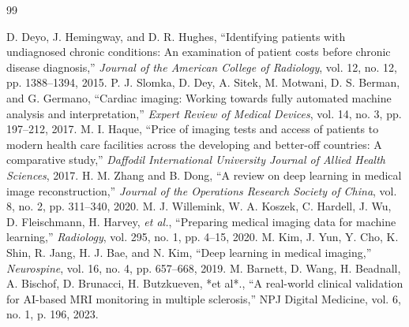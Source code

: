 \documentclass[12pt,letterpaper]{article}     %
\begin{document}
\newpage
\begin{thebibliography}{99}

D. Deyo, J. Hemingway, and D. R. Hughes, “Identifying patients with undiagnosed chronic conditions: An examination of patient costs before chronic disease diagnosis,” \textit{Journal of the American College of Radiology}, vol. 12, no. 12, pp. 1388–1394, 2015.
P. J. Slomka, D. Dey, A. Sitek, M. Motwani, D. S. Berman, and G. Germano, “Cardiac imaging: Working towards fully automated machine analysis and interpretation,” \textit{Expert Review of Medical Devices}, vol. 14, no. 3, pp. 197–212, 2017.
M. I. Haque, “Price of imaging tests and access of patients to modern health care facilities across the developing and better-off countries: A comparative study,” \textit{Daffodil International University Journal of Allied Health Sciences}, 2017.
H. M. Zhang and B. Dong, “A review on deep learning in medical image reconstruction,” \textit{Journal of the Operations Research Society of China}, vol. 8, no. 2, pp. 311–340, 2020.
M. J. Willemink, W. A. Koszek, C. Hardell, J. Wu, D. Fleischmann, H. Harvey, \emph{et al.}, “Preparing medical imaging data for machine learning,” \textit{Radiology}, vol. 295, no. 1, pp. 4–15, 2020.
M. Kim, J. Yun, Y. Cho, K. Shin, R. Jang, H. J. Bae, and N. Kim, “Deep learning in medical imaging,” \emph{Neurospine}, vol. 16, no. 4, pp. 657–668, 2019.
M. Barnett, D. Wang, H. Beadnall, A. Bischof, D. Brunacci, H. Butzkueven, *et al*., 
“A real-world clinical validation for AI-based MRI monitoring in multiple sclerosis,” 
NPJ Digital Medicine, vol. 6, no. 1, p. 196, 2023.






\end{thebibliography}



\newpage

\end{document}
